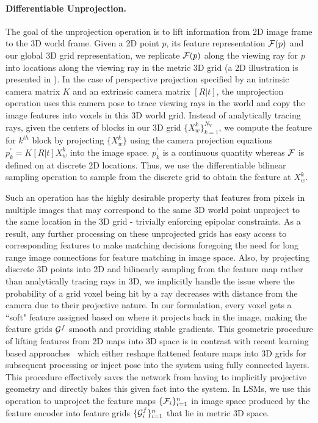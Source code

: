 \documentclass[../thesis.tex]{subfiles}
\begin{document}
\paragraph{Differentiable Unprojection.}
The goal of the unprojection operation is to lift information from 2D image frame to the  3D world frame. Given a 2D point $p$, its feature representation $\mathcal{F}(p)$ and our global 3D grid representation, we replicate $\mathcal{F}(p)$ along the viewing ray for $p$ into locations along the viewing ray in the metric 3D grid (a 2D illustration is presented in ). In the case of perspective projection specified by an intrinsic camera matrix $K$ and an extrinsic camera matrix $[R|t]$, the unprojection operation uses this camera pose to trace viewing rays in the world and copy the image features into voxels in this 3D world grid. Instead of analytically tracing rays, given the centers of blocks in our 3D grid $\{X_w^k\}_{k=1}^{N_V}$, we compute the feature for $k^{th}$ block by projecting $\{X_w^k\}$ using the camera projection equations $p_k^\prime=K[R|t]X_{w}^k$ into the image space. $p_k^\prime$ is a continuous quantity whereas $\mathcal{F}$ is defined on at discrete 2D locations. Thus, we use the differentiable bilinear sampling operation to sample from the discrete grid \cite{spatialtrans_nips2015} to obtain the feature at $X_{w}^k$. 

Such an operation has the highly desirable property that features from pixels in multiple images that may correspond to the same 3D world point unproject to the same location in the 3D grid - trivially enforcing epipolar constraints. As a result, any further processing on these unprojected grids has easy access to corresponding features to make matching decisions foregoing the need for long range image connections for feature matching in image space. Also, by projecting discrete 3D points into 2D and bilinearly sampling from the feature map rather than analytically tracing rays in 3D, we implicitly handle the issue where the probability of a grid voxel being hit by a ray decreases with distance from the camera due to their projective nature. In our formulation, every voxel gets a ``soft" feature assigned based on where it projects back in the image, making the feature grids $\mathcal{G}^f$ smooth and providing stable gradients. This geometric procedure of lifting features from 2D maps into 3D space is in contrast with recent learning based approaches~\cite{choy20163d,tatarchenko2016multi} which either reshape flattened feature maps into 3D grids for subsequent processing or inject pose into the system using fully connected layers. This procedure effectively saves the network from having to implicitly  projective geometry and directly bakes this given fact into the system. In LSMs, we use this operation to unproject the feature maps $\{\mathcal{F}_i\}_{i=1}^n$ in image space produced by the feature encoder into feature grids $\{\mathcal{G}^f_i\}_{i=1}^n$ that lie in metric 3D space.
\end{document}
